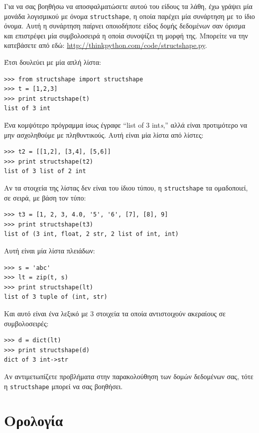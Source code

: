 \documentclass[10pt]{book}
\begin{document}

Για να σας βοηθήσω να αποσφαλματώσετε αυτού του είδους τα λάθη, έχω γράψει μία μονάδα λογισμικού με όνομα {\tt structshape},  η οποία παρέχει μία συνάρτηση με το ίδιο όνομα. Αυτή η συνάρτηση παίρνει οποιοδήποτε είδος δομής δεδομένων σαν όρισμα και επιστρέφει μία συμβολοσειρά η οποία συνοψίζει τη μορφή της. Μπορείτε να την κατεβάσετε από εδώ: \url{http://thinkpython.com/code/structshape.py}.

Έτσι δουλεύει με μία απλή λίστα:

\begin{verbatim}
>>> from structshape import structshape
>>> t = [1,2,3]
>>> print structshape(t)
list of 3 int
\end{verbatim}
%
Ένα κομψότερο πρόγραμμα ίσως έγραφε ``list of 3 int{\em s},'' αλλά είναι προτιμότερο να μην ασχοληθούμε με πληθυντικούς. Αυτή είναι μία λίστα από λίστες:

\begin{verbatim}
>>> t2 = [[1,2], [3,4], [5,6]]
>>> print structshape(t2)
list of 3 list of 2 int
\end{verbatim}
%
Αν τα στοιχεία της λίστας δεν είναι του ίδιου τύπου, η {\tt structshape} τα ομαδοποιεί, σε σειρά, με βάση τον τύπο:

\begin{verbatim}
>>> t3 = [1, 2, 3, 4.0, '5', '6', [7], [8], 9]
>>> print structshape(t3)
list of (3 int, float, 2 str, 2 list of int, int)
\end{verbatim}
%
Αυτή είναι μία λίστα πλειάδων:

\begin{verbatim}
>>> s = 'abc'
>>> lt = zip(t, s)
>>> print structshape(lt)
list of 3 tuple of (int, str)
\end{verbatim}
%
Και αυτό είναι ένα λεξικό με 3 στοιχεία τα οποία αντιστοιχούν ακεραίους σε συμβολοσειρές:

\begin{verbatim}
>>> d = dict(lt)
>>> print structshape(d)
dict of 3 int->str
\end{verbatim}
%
Αν αντιμετωπίζετε προβλήματα στην παρακολούθηση των δομών δεδομένων σας, τότε η {\tt structshape} μπορεί να σας βοηθήσει.



\section{Ορολογία}
\end{document}
